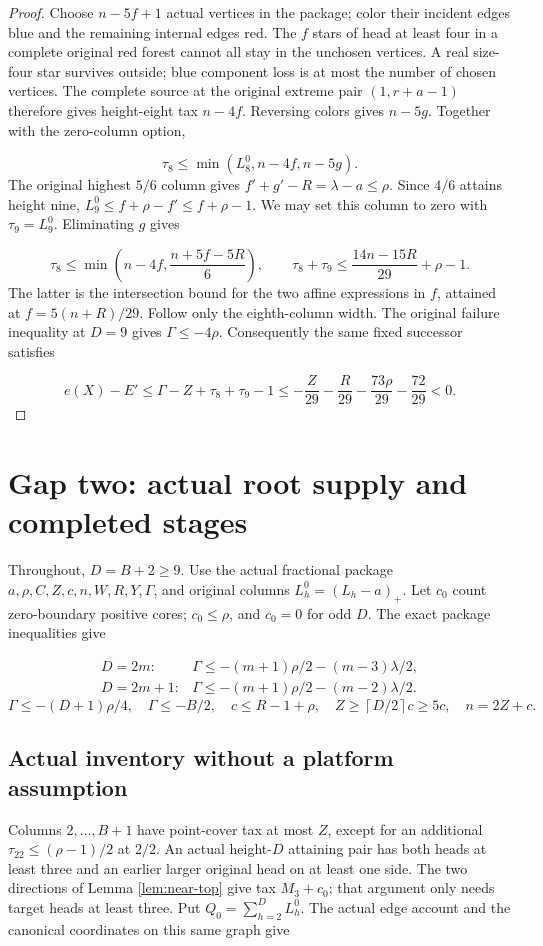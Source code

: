\documentclass[11pt,a4paper]{article}
\newcommand{\ceil}[1]{\left\lceil#1\right\rceil}
\theoremstyle{definition}
\begin{document}
\begin{proof}
Choose $n-5f+1$ actual vertices in the package; color their incident edges
blue and the remaining internal edges red.
The $f$ stars of head at least four in a complete original red forest
cannot all stay in the unchosen vertices. A real size-four star survives outside;
blue component loss is at most the number of chosen vertices.
The complete source at the original extreme pair $(1,r+a-1)$
therefore gives height-eight tax $n-4f$.
Reversing colors gives $n-5g$. Together with the zero-column option,

\[
\tau_8\le\min(L_8^0,n-4f,n-5g).
\]
The original highest $5/6$ column gives $f'+g'-R=\lambda-a\le\rho$.
Since $4/6$ attains height nine,
$L_9^0\le f+\rho-f'\le f+\rho-1$.
We may set this column to zero with $\tau_9=L_9^0$.
Eliminating $g$ gives

\[
\tau_8\le\min\left(n-4f,\frac{n+5f-5R}{6}\right),\qquad
\tau_8+\tau_9\le\frac{14n-15R}{29}+\rho-1.
\]
The latter is the intersection bound for the two affine expressions
in $f$, attained at $f=5(n+R)/29$.
Follow only the eighth-column width.
The original failure inequality at $D=9$ gives $\Gamma\le-4\rho$.
Consequently the same fixed successor satisfies

\[
e(X)-E'\le\Gamma-Z+\tau_8+\tau_9-1
\le-\frac Z{29}-\frac R{29}-\frac{73\rho}{29}-\frac{72}{29}<0.
\]
\end{proof}
\section{Gap two: actual root supply and completed stages}\label{app:gap2-stages}
Throughout, $D=B+2\ge9$. Use the actual fractional package
$a,\rho,C,Z,c,n,W,R,Y,\Gamma$, and original columns $L_h^0=(L_h-a)_+$.
Let $c_0$ count zero-boundary positive cores;
$c_0\le\rho$, and $c_0=0$ for odd $D$.
The exact package inequalities give

\begin{equation}\label{eq:gap2-debt}
\begin{array}{ll}
D=2m:&\Gamma\le-(m+1)\rho/2-(m-3)\lambda/2,\\
D=2m+1:&\Gamma\le-(m+1)\rho/2-(m-2)\lambda/2.
\end{array}
\end{equation}
\[
\Gamma\le-(D+1)\rho/4,\quad \Gamma\le-B/2,\quad
c\le R-1+\rho,\quad Z\ge\ceil{D/2}c\ge5c,\quad n=2Z+c.
\]
\subsection{Actual inventory without a platform assumption}
Columns $2,\ldots,B+1$ have point-cover tax at most $Z$,
except for an additional $\tau_{22}\le(\rho-1)/2$ at $2/2$.
An actual height-$D$ attaining pair has both heads at least three and
an earlier larger original head on at least one side.
The two directions of Lemma \ref{lem:near-top} give tax $M_3+c_0$;
that argument only needs target heads at least three.
Put $Q_0=\sum_{h=2}^D L_h^0$. The actual edge account and
the canonical coordinates on this same graph give
\end{document}
